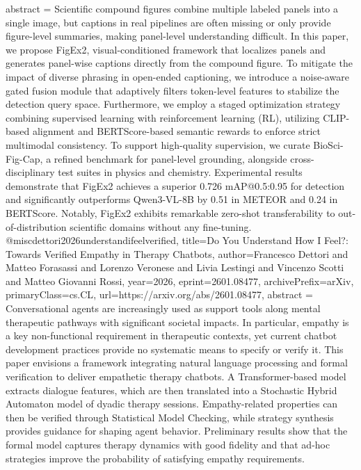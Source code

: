 {      abstract = {Scientific compound figures combine multiple labeled panels into a single image, but captions in real pipelines are often missing or only provide figure-level summaries, making panel-level understanding difficult. In this paper, we propose FigEx2, visual-conditioned framework that localizes panels and generates panel-wise captions directly from the compound figure. To mitigate the impact of diverse phrasing in open-ended captioning, we introduce a noise-aware gated fusion module that adaptively filters token-level features to stabilize the detection query space. Furthermore, we employ a staged optimization strategy combining supervised learning with reinforcement learning (RL), utilizing CLIP-based alignment and BERTScore-based semantic rewards to enforce strict multimodal consistency. To support high-quality supervision, we curate BioSci-Fig-Cap, a refined benchmark for panel-level grounding, alongside cross-disciplinary test suites in physics and chemistry. Experimental results demonstrate that FigEx2 achieves a superior 0.726 mAP@0.5:0.95 for detection and significantly outperforms Qwen3-VL-8B by 0.51 in METEOR and 0.24 in BERTScore. Notably, FigEx2 exhibits remarkable zero-shot transferability to out-of-distribution scientific domains without any fine-tuning.}
}@misc{dettori2026understandifeelverified,
      title={Do You Understand How I Feel?: Towards Verified Empathy in Therapy Chatbots}, 
      author={Francesco Dettori and Matteo Forasassi and Lorenzo Veronese and Livia Lestingi and Vincenzo Scotti and Matteo Giovanni Rossi},
      year={2026},
      eprint={2601.08477},
      archivePrefix={arXiv},
      primaryClass={cs.CL},
      url={https://arxiv.org/abs/2601.08477},
      abstract = {Conversational agents are increasingly used as support tools along mental therapeutic pathways with significant societal impacts. In particular, empathy is a key non-functional requirement in therapeutic contexts, yet current chatbot development practices provide no systematic means to specify or verify it. This paper envisions a framework integrating natural language processing and formal verification to deliver empathetic therapy chatbots. A Transformer-based model extracts dialogue features, which are then translated into a Stochastic Hybrid Automaton model of dyadic therapy sessions. Empathy-related properties can then be verified through Statistical Model Checking, while strategy synthesis provides guidance for shaping agent behavior. Preliminary results show that the formal model captures therapy dynamics with good fidelity and that ad-hoc strategies improve the probability of satisfying empathy requirements.}
}
